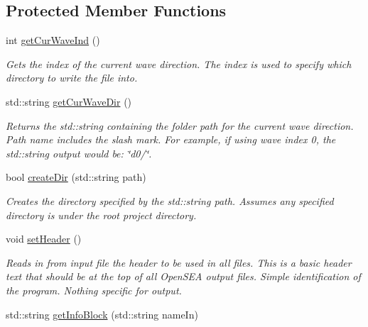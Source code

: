 \subsection*{Protected Member Functions}
\begin{DoxyCompactItemize}
\item 
int \hyperlink{classosea_1_1ofreq_1_1_file_writer_a9748d987475a225b49e14f48b8be0cd6}{get\-Cur\-Wave\-Ind} ()
\begin{DoxyCompactList}\small\item\em Gets the index of the current wave direction. The index is used to specify which directory to write the file into. \end{DoxyCompactList}\item 
std\-::string \hyperlink{classosea_1_1ofreq_1_1_file_writer_a82a3acb66bd5c0396836386258608a40}{get\-Cur\-Wave\-Dir} ()
\begin{DoxyCompactList}\small\item\em Returns the std\-::string containing the folder path for the current wave direction. Path name includes the slash mark. For example, if using wave index 0, the std\-::string output would be\-: \char`\"{}d0/\char`\"{}. \end{DoxyCompactList}\item 
bool \hyperlink{classosea_1_1ofreq_1_1_file_writer_ae8deeb9fc4323edf326fb0dadc4f9380}{create\-Dir} (std\-::string path)
\begin{DoxyCompactList}\small\item\em Creates the directory specified by the std\-::string path. Assumes any specified directory is under the root project directory. \end{DoxyCompactList}\item 
\hypertarget{classosea_1_1ofreq_1_1_file_writer_aeea3ca877f0c5280b22ea7ff653db233}{void \hyperlink{classosea_1_1ofreq_1_1_file_writer_aeea3ca877f0c5280b22ea7ff653db233}{set\-Header} ()}\label{classosea_1_1ofreq_1_1_file_writer_aeea3ca877f0c5280b22ea7ff653db233}

\begin{DoxyCompactList}\small\item\em Reads in from input file the header to be used in all files. This is a basic header text that should be at the top of all Open\-S\-E\-A output files. Simple identification of the program. Nothing specific for output. \end{DoxyCompactList}\item 
std\-::string \hyperlink{classosea_1_1ofreq_1_1_file_writer_a8b2b109105916979fe152960bbadcf7f}{get\-Info\-Block} (std\-::string name\-In)
\end{DoxyCompactItemize}
